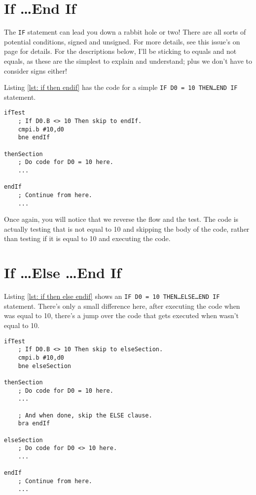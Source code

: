 \section{If \ldots\protect End If}

The \texttt{IF} statement can lead you down a rabbit hole or two! There are all sorts of potential conditions, signed and unsigned. For more details, see this issue's  on page \pageref{chpater: beginners corner} for details. For the descriptions below, I'll be sticking to equals and not equals, as these are the simplest to explain and understand; plus we don't have to consider signs either!

Listing \ref{lst: if then endif} has the code for a simple \texttt{IF D0 = 10 THEN\ldots{}END IF} statement.

\begin{lstlisting}[caption={If \ldots THEN \ldots END IF},label={lst: if then endif}]
ifTest
    ; If D0.B <> 10 Then skip to endIf.
    cmpi.b #10,d0
    bne endIf
    
thenSection
    ; Do code for D0 = 10 here.
    ...
    
endIf
    ; Continue from here.
    ...
\end{lstlisting}

Once again, you will notice that we reverse the flow and the test. The code is actually testing that  is not equal to 10 and skipping the body of the code, rather than testing if it is equal to 10 and executing the code.

\section{If \ldots\protect Else \ldots\protect End If}

Listing \ref{lst: if then else endif} shows an \texttt{IF D0 = 10 THEN\ldots{}ELSE\ldots{}END IF} statement. There's only a small difference here, after executing the code when  was equal to 10, there's a jump over the code that gets executed when  wasn't equal to 10.


\begin{lstlisting}[caption={If \ldots THEN \ldots ELSE \ldots END IF},label={lst: if then else endif}]
ifTest
    ; If D0.B <> 10 Then skip to elseSection.
    cmpi.b #10,d0
    bne elseSection
    
thenSection
    ; Do code for D0 = 10 here.
    ...
    
    ; And when done, skip the ELSE clause.
    bra endIf
    
elseSection   
    ; Do code for D0 <> 10 here.
    ... 
    
endIf
    ; Continue from here.
    ...
\end{lstlisting}

